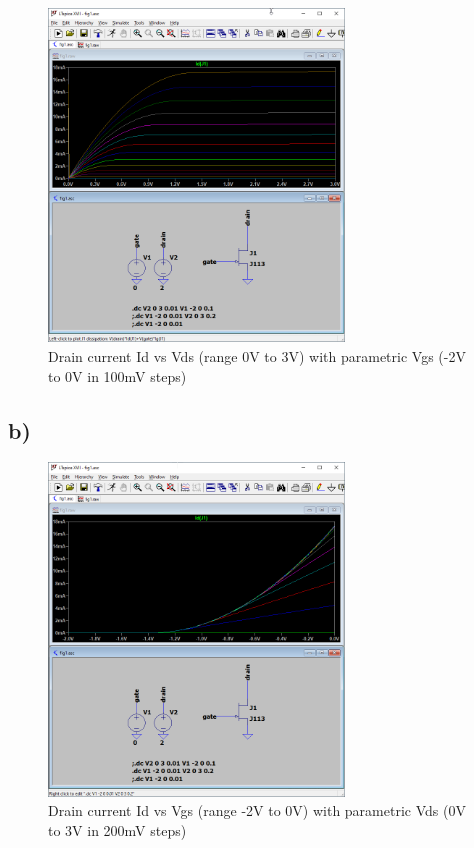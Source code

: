 \documentclass{article}
\begin{document}
	\begin{figure}[H]
	    \centering
	    \includegraphics[width=0.7\textwidth]{1a}
	    \caption{Drain current Id vs Vds (range 0V to 3V) with parametric Vgs (-2V to 0V in 100mV steps)}
	\end{figure}
	
	\subsection*{b)}
	
	\begin{figure}[H]
	    \centering
	    \includegraphics[width=0.7\textwidth]{1b}
	    \caption{Drain current Id vs Vgs (range -2V to 0V) with parametric Vds (0V to 3V in 200mV steps)}
	\end{figure}
		
\end{document}
